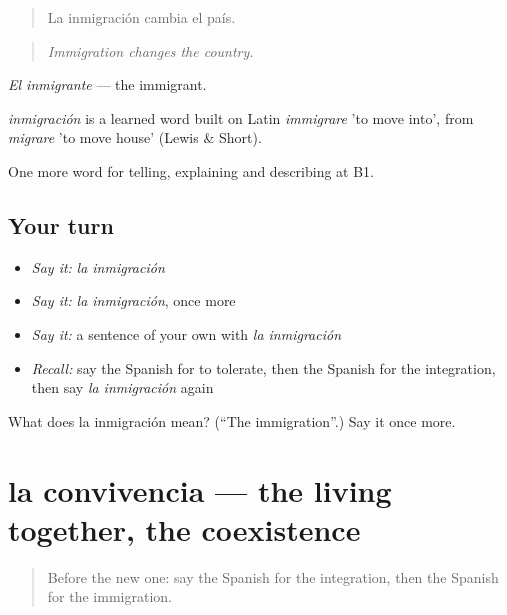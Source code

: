\begin{quote}
La inmigración cambia el país.
\end{quote}

\begin{quote}
\emph{Immigration changes the country.}
\end{quote}

\emph{El inmigrante} — the immigrant.

\begin{cousinweb}
\emph{inmigración} is a learned word built on Latin \emph{immigrare} 'to move into', from \emph{migrare} 'to move house' (Lewis \& Short).
\end{cousinweb}

\begin{grammarlens}[title={What you've built}]
One more word for telling, explaining and describing at B1.
\end{grammarlens}

\subsection*{Your turn}
\begin{itemize}
\raggedright
  \item \emph{Say it:} \emph{la inmigración}
  \item \emph{Say it:} \emph{la inmigración}, once more
  \item \emph{Say it:} a sentence of your own with \emph{la inmigración}
  \item \emph{Recall:} say the Spanish for to tolerate, then the Spanish for the integration, then say \emph{la inmigración} again
\end{itemize}

\begin{tcolorbox}[breakable,colback=teal!4,colframe=teal!35!black,title={Before you move on}]
What does la inmigración mean? (\textquotedblleft{}The immigration\textquotedblright{}.) Say it once more.
\end{tcolorbox}
\section[la convivencia]{la convivencia — the living together, the coexistence}

\label{lesson:ES-C610-convivencia}



\begin{quote}
Before the new one: say the Spanish for the integration, then the Spanish for the immigration.
\end{quote}

